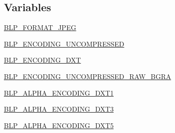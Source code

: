 \subsection*{Variables}
\begin{DoxyCompactItemize}
\item 
\hyperlink{namespacePIL_1_1BlpImagePlugin_a44adbc65c9d85b7f6b797686d08d7e21}{B\+L\+P\+\_\+\+F\+O\+R\+M\+A\+T\+\_\+\+J\+P\+EG}
\item 
\hyperlink{namespacePIL_1_1BlpImagePlugin_aa738911043bb946621e54fcbdecdefe9}{B\+L\+P\+\_\+\+E\+N\+C\+O\+D\+I\+N\+G\+\_\+\+U\+N\+C\+O\+M\+P\+R\+E\+S\+S\+ED}
\item 
\hyperlink{namespacePIL_1_1BlpImagePlugin_ab680e1381c7e56f756b5faf38bf7666f}{B\+L\+P\+\_\+\+E\+N\+C\+O\+D\+I\+N\+G\+\_\+\+D\+XT}
\item 
\hyperlink{namespacePIL_1_1BlpImagePlugin_a1819ef98917bf42b3b1f75bc058611f8}{B\+L\+P\+\_\+\+E\+N\+C\+O\+D\+I\+N\+G\+\_\+\+U\+N\+C\+O\+M\+P\+R\+E\+S\+S\+E\+D\+\_\+\+R\+A\+W\+\_\+\+B\+G\+RA}
\item 
\hyperlink{namespacePIL_1_1BlpImagePlugin_a25f970d870f584bbb9dac5a9fc09d0de}{B\+L\+P\+\_\+\+A\+L\+P\+H\+A\+\_\+\+E\+N\+C\+O\+D\+I\+N\+G\+\_\+\+D\+X\+T1}
\item 
\hyperlink{namespacePIL_1_1BlpImagePlugin_add79a7985512eca02e517c512d9f72b9}{B\+L\+P\+\_\+\+A\+L\+P\+H\+A\+\_\+\+E\+N\+C\+O\+D\+I\+N\+G\+\_\+\+D\+X\+T3}
\item 
\hyperlink{namespacePIL_1_1BlpImagePlugin_afa5ffd294bf41fec282970b53584e45c}{B\+L\+P\+\_\+\+A\+L\+P\+H\+A\+\_\+\+E\+N\+C\+O\+D\+I\+N\+G\+\_\+\+D\+X\+T5}
\end{DoxyCompactItemize}


